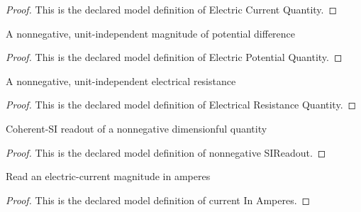 \begin{proof}
  This is the declared model definition of Electric Current Quantity.
\end{proof}
\begin{definition}
  \label{def:physics:phyx-mini-0572:phyxminiproblems-problemphyxmini0572-electricpotentialquantity}
  A nonnegative, unit-independent magnitude of potential difference
\end{definition}
\begin{proof}
  This is the declared model definition of Electric Potential Quantity.
\end{proof}
\begin{definition}
  \label{def:physics:phyx-mini-0572:phyxminiproblems-problemphyxmini0572-electricalresistancequantity}
  A nonnegative, unit-independent electrical resistance
\end{definition}
\begin{proof}
  This is the declared model definition of Electrical Resistance Quantity.
\end{proof}
\begin{definition}
  \label{def:physics:phyx-mini-0572:phyxminiproblems-problemphyxmini0572-nonnegativesireadout}
  Coherent-SI readout of a nonnegative dimensionful quantity
\end{definition}
\begin{proof}
  This is the declared model definition of nonnegative SIReadout.
\end{proof}
\begin{definition}
  \label{def:physics:phyx-mini-0572:phyxminiproblems-problemphyxmini0572-currentinamperes}
  Read an electric-current magnitude in amperes
\end{definition}
\begin{proof}
  This is the declared model definition of current In Amperes.
\end{proof}
